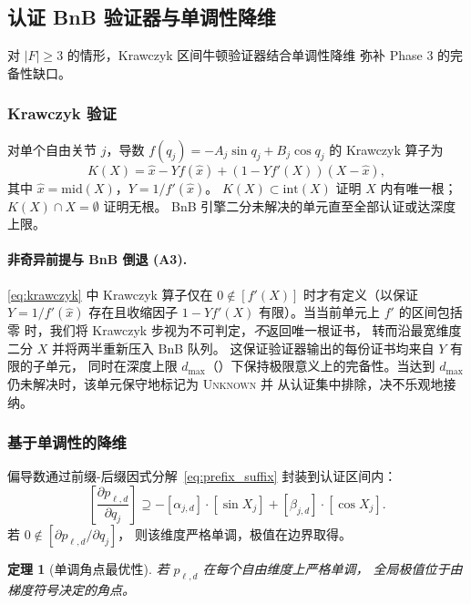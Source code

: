 \documentclass[journal]{IEEEtran}
\newtheorem{theorem}{定理}
\begin{document}
\subsection{认证 BnB 验证器与单调性降维}\label{sec:bnb}

对 $|F|\geq 3$ 的情形，Krawczyk 区间牛顿验证器结合单调性降维
弥补 Phase 3 的完备性缺口。

\subsubsection{Krawczyk 验证}

对单个自由关节 $j$，导数 $f(q_j) = -A_j\sin q_j + B_j\cos q_j$
的 Krawczyk 算子为
\begin{equation}\label{eq:krawczyk}
  K(X) = \hat{x} - Yf(\hat{x}) + (1 - Yf'(X))(X - \hat{x}),
\end{equation}
其中 $\hat{x} = \mathrm{mid}(X)$，$Y = 1/f'(\hat{x})$。
$K(X) \subset \mathrm{int}(X)$ 证明 $X$ 内有唯一根；
$K(X) \cap X = \emptyset$ 证明无根。
BnB 引擎二分未解决的单元直至全部认证或达深度上限。

\paragraph{非奇异前提与 BnB 倒退 (A3).}
\eqref{eq:krawczyk} 中 Krawczyk 算子仅在 $0\notin[f'(X)]$
时才有定义（以保证 $Y=1/f'(\hat{x})$ 存在且收缩因子
$1-Yf'(X)$ 有限）。当当前单元上 $f'$ 的区间包括零
时，我们将 Krawczyk 步视为不可判定，\emph{不}返回唯一根证书，
转而沿最宽维度二分 $X$ 并将两半重新压入 BnB 队列。
这保证验证器输出的每份证书均来自 $Y$ 有限的子单元，
同时在深度上限 $d_{\max}$（）下保持极限意义上的完备性。当达到
$d_{\max}$ 仍未解决时，该单元保守地标记为 \textsc{Unknown} 并
从认证集中排除，决不乐观地接纳。

\subsubsection{基于单调性的降维}

偏导数通过前缀-后缀因式分解~\eqref{eq:prefix_suffix}
封装到认证区间内：
\begin{equation}\label{eq:mono_test}
  \left[\frac{\partial p_{\ell,d}}{\partial q_j}\right]
  \supseteq -[\alpha_{j,d}]\cdot[\sin X_j]
  + [\beta_{j,d}]\cdot[\cos X_j].
\end{equation}
若 $0 \notin [\partial p_{\ell,d}/\partial q_j]$，
则该维度严格单调，极值在边界取得。

\begin{theorem}[单调角点最优性]\label{thm:monotone}
若 $p_{\ell,d}$ 在每个自由维度上严格单调，
全局极值位于由梯度符号决定的角点。
\end{theorem}
\end{document}
